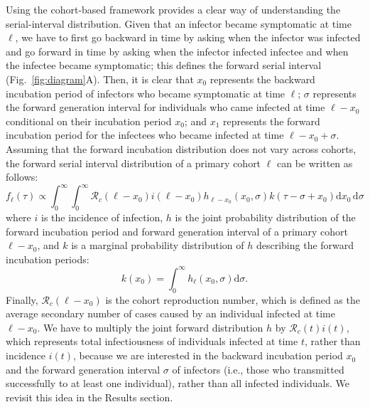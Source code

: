 \documentclass[12pt]{article}
\newcommand{\fref}[1]{Fig.~\ref{fig:#1}}
\begin{document}
Using the cohort-based framework provides a clear way of understanding the serial-interval distribution.
Given that an infector became symptomatic at time $\ell$, we have to first go backward in time by asking when the infector was infected and go forward in time by asking when the infector infected infectee and when the infectee became symptomatic;
this defines the forward serial interval (\fref{diagram}A).
Then, it is clear that $x_0$ represents the backward incubation period of infectors who became symptomatic at time $\ell$; 
$\sigma$ represents the forward generation interval for individuals who came infected at time $\ell - x_0$ conditional on their incubation period $x_0$;
and $x_1$ represents the forward incubation period for the infectees who became infected at time $\ell - x_0 + \sigma$.
Assuming that the forward incubation distribution does not vary across cohorts, the forward serial interval distribution of a primary cohort $\ell$ can be written as follows:
\begin{equation}
f_\ell(\tau) \propto \int_{0}^\infty \int_{0}^\infty \mathcal R_c (\ell - x_0) i(\ell - x_0) h_{\ell - x_0}(x_0, \sigma) k(\tau-\sigma+x_0) \mathrm{d} x_0\, \mathrm{d}\sigma
\label{eq:forward}
\end{equation}
where $i$ is the incidence of infection, $h$ is the joint probability distribution of the forward incubation period and forward generation interval of a primary cohort $\ell - x_0$, and $k$ is a marginal probability distribution of $h$ describing the forward incubation periods:
\begin{equation}
k(x_0) = \int_0^\infty h_\ell(x_0, \sigma) \mathrm{d}\sigma.
\end{equation}
Finally, $\mathcal R_c (\ell - x_0)$ is the cohort reproduction number, which is defined as the average secondary number of cases caused by an individual infected at time $\ell - x_0$.
We have to multiply the joint forward distribution $h$ by $\mathcal R_c (t) i(t)$, which represents total infectiousness of individuals infected at time $t$, rather than incidence $i(t)$, because we are interested in the backward incubation period $x_0$ and the forward generation interval $\sigma$ of infectors (i.e., those who transmitted successfully to at least one individual), rather than all infected individuals.
We revisit this idea in the Results section.
\end{document}
